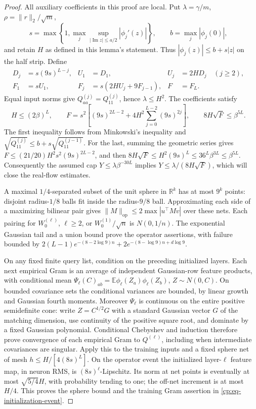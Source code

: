 \begin{proof}
All auxiliary coefficients in this proof are local. Put
$\lambda=\gamma/m$, $\rho=\|r\|_2/\sqrt m$,
\[
 s=\max\left\{1,\max_j\sup_{|\operatorname{Im}z|\le a/2}
 |\phi_j'(z)|\right\},\qquad b=\max_j|\phi_j(0)|,
\]
and retain $H$ as defined in this lemma's statement. Thus
$|\phi_j(z)|\le b+s|z|$ on the half strip. Define
\begin{align}
 D_j&=s(9s)^{L-j},&
 U_1&=D_1,& U_j&=2HD_j\quad(j\ge2),\nonumber\\
 F_1&=sU_1,&F_j&=s(2HU_j+9F_{j-1}),&F&=F_L.
 \label{cp:eq-fitting-coefficients}
\end{align}
Equal input norms give $Q^{(j)}_{aa}=Q^{(j)}_{11}$, hence
$\lambda\le H^2$. The coefficients satisfy
\begin{equation}
 H\le(2\beta)^L,\qquad
 F=s^2\left[(9s)^{2L-2}+4H^2\sum_{j=0}^{L-2}(9s)^{2j}\right],
 \qquad8H\sqrt F\le\beta^{5L}.
 \label{cp:eq-fitting-powers}
\end{equation}
The first inequality follows from Minkowski's inequality and
$\sqrt{Q^{(j)}_{11}}\le b+s\sqrt{Q^{(j-1)}_{11}}$.
For the last, summing the geometric series gives
$F\le(21/20)H^2s^2(9s)^{2L-2}$, and then
$8H\sqrt F\le H^2(9s)^L\le36^L\beta^{3L}\le\beta^{5L}$.
Consequently the assumed cap
$Y\le\lambda\beta^{-30L}$ implies
$Y\le\lambda/(8H\sqrt F)$, which will close the real-flow estimates.

A maximal $1/4$-separated subset of the unit sphere in $\mathbb R^k$
has at most $9^k$ points: disjoint radius-$1/8$ balls fit inside the
radius-$9/8$ ball.  Approximating each side of a maximizing bilinear
pair gives $\|M\|_{\mathrm{op}}\le2\max|u^\top Mv|$ over these nets.
Each pairing for $W_0^{(\ell)}$, $\ell\ge2$, or
$W_0^{(1)}/\sqrt n$ is $N(0,1/n)$.  The exponential Gaussian tail and
a union bound prove the operator assertions, with failure bounded by
$2(L-1)e^{-(8-2\log9)n}+2e^{-(8-\log9)n+d\log9}$.

On any fixed finite query list, condition on the preceding initialized
layers.  Each next empirical Gram is an average of independent
Gaussian-row feature products, with conditional mean
$\Psi_\ell(C)_{ab}=\mathbb E\phi_\ell(Z_a)\phi_\ell(Z_b)$,
$Z\sim N(0,C)$.  On bounded covariance sets the conditional variances
are bounded, by linear growth and Gaussian fourth moments.  Moreover
$\Psi_\ell$ is continuous on the entire positive semidefinite cone:
write $Z=C^{1/2}G$ with a standard Gaussian vector $G$ of the matching
dimension, use continuity of the positive square root, and
dominate by a fixed Gaussian polynomial.  Conditional Chebyshev and
induction therefore prove convergence of each empirical Gram to
$Q^{(\ell)}$, including when intermediate covariances are singular.
Apply this to the training inputs and a fixed sphere net of mesh
$h\le H/[4(8s)^L]$.  On the operator event the initialized layer-$\ell$
feature map, in neuron RMS, is $(8s)^\ell$-Lipschitz.  Its norm at net
points is eventually at most $\sqrt{5/4}H$, with probability tending to
one; the off-net increment is at most $H/4$.  This proves the sphere
bound and the training Gram assertion in
\eqref{cp:eq-initialization-event}.


\end{proof}
